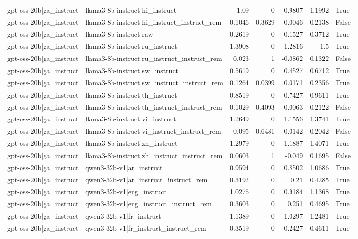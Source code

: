 \begin{table}
\begin{tabular}{l l r r r r l}
gpt-oss-20b|ga_instruct & llama3-8b-instruct|hi_instruct & 1.09 & 0 & 0.9807 & 1.1992 & True \\
gpt-oss-20b|ga_instruct & llama3-8b-instruct|hi_instruct_instruct_rem & 0.1046 & 0.3629 & -0.0046 & 0.2138 & False \\
gpt-oss-20b|ga_instruct & llama3-8b-instruct|raw & 0.2619 & 0 & 0.1527 & 0.3712 & True \\
gpt-oss-20b|ga_instruct & llama3-8b-instruct|ru_instruct & 1.3908 & 0 & 1.2816 & 1.5 & True \\
gpt-oss-20b|ga_instruct & llama3-8b-instruct|ru_instruct_instruct_rem & 0.023 & 1 & -0.0862 & 0.1322 & False \\
gpt-oss-20b|ga_instruct & llama3-8b-instruct|sw_instruct & 0.5619 & 0 & 0.4527 & 0.6712 & True \\
gpt-oss-20b|ga_instruct & llama3-8b-instruct|sw_instruct_instruct_rem & 0.1264 & 0.0399 & 0.0171 & 0.2356 & True \\
gpt-oss-20b|ga_instruct & llama3-8b-instruct|th_instruct & 0.8519 & 0 & 0.7427 & 0.9611 & True \\
gpt-oss-20b|ga_instruct & llama3-8b-instruct|th_instruct_instruct_rem & 0.1029 & 0.4093 & -0.0063 & 0.2122 & False \\
gpt-oss-20b|ga_instruct & llama3-8b-instruct|vi_instruct & 1.2649 & 0 & 1.1556 & 1.3741 & True \\
gpt-oss-20b|ga_instruct & llama3-8b-instruct|vi_instruct_instruct_rem & 0.095 & 0.6481 & -0.0142 & 0.2042 & False \\
gpt-oss-20b|ga_instruct & llama3-8b-instruct|zh_instruct & 1.2979 & 0 & 1.1887 & 1.4071 & True \\
gpt-oss-20b|ga_instruct & llama3-8b-instruct|zh_instruct_instruct_rem & 0.0603 & 1 & -0.049 & 0.1695 & False \\
gpt-oss-20b|ga_instruct & qwen3-32b-v1|ar_instruct & 0.9594 & 0 & 0.8502 & 1.0686 & True \\
gpt-oss-20b|ga_instruct & qwen3-32b-v1|ar_instruct_instruct_rem & 0.3192 & 0 & 0.21 & 0.4285 & True \\
gpt-oss-20b|ga_instruct & qwen3-32b-v1|eng_instruct & 1.0276 & 0 & 0.9184 & 1.1368 & True \\
gpt-oss-20b|ga_instruct & qwen3-32b-v1|eng_instruct_instruct_rem & 0.3603 & 0 & 0.251 & 0.4695 & True \\
gpt-oss-20b|ga_instruct & qwen3-32b-v1|fr_instruct & 1.1389 & 0 & 1.0297 & 1.2481 & True \\
gpt-oss-20b|ga_instruct & qwen3-32b-v1|fr_instruct_instruct_rem & 0.3519 & 0 & 0.2427 & 0.4611 & True \\

\end{tabular}
\end{table}
